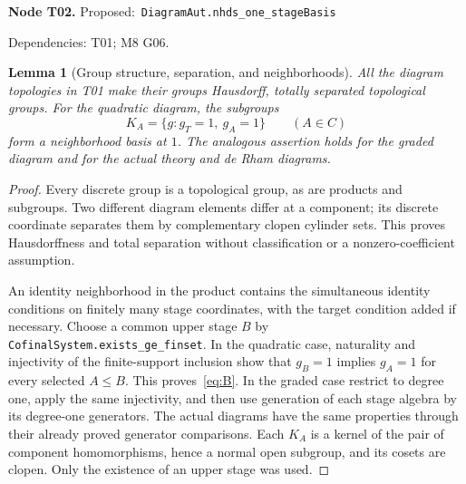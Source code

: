 \documentclass[11pt]{article}
\newtheorem{lemma}[theorem]{Lemma}
\theoremstyle{remark}\newtheorem{remark}[theorem]{Remark}
\newcommand{\code}[1]{{\normalfont\nolinkurl{#1}}}
\newcommand{\node}[3]{\par\Needspace{8\baselineskip}\smallskip\noindent\textbf{Node #1.}\quad
 \textsf{Proposed:}\ \code{#2}\par\noindent
 \textsf{Dependencies:} #3.\par\smallskip}
\begin{document}
\node{T02}{DiagramAut.nhds_one_stageBasis}{T01; M8 G06}
\begin{lemma}[Group structure, separation, and neighborhoods]\label{lem:t02}
All the diagram topologies in T01 make their groups Hausdorff, totally
separated topological groups. For the quadratic diagram, the subgroups
\[
 K_A=\{g:g_T=1,\ g_A=1\}\qquad(A\in C)
                                                               \tag{B}\label{eq:B}
\]
form a neighborhood basis at $1$. The analogous assertion holds for the
graded diagram and for the actual theory and de Rham diagrams.
\end{lemma}
\begin{proof}
Every discrete group is a topological group, as are products and
subgroups. Two different diagram elements differ at a component; its
discrete coordinate separates them by complementary clopen cylinder
sets. This proves Hausdorffness and total separation without
classification or a nonzero-coefficient assumption.

An identity neighborhood in the product contains the simultaneous
identity conditions on finitely many stage coordinates, with the target
condition added if necessary. Choose a common upper stage $B$ by
\code{CofinalSystem.exists_ge_finset}. In the quadratic case, naturality
and injectivity of the finite-support inclusion show that $g_B=1$
implies $g_A=1$ for every selected $A\leq B$. This proves~\eqref{eq:B}.
In the graded case restrict to degree one, apply the same injectivity,
and then use generation of each stage algebra by its degree-one
generators. The actual diagrams have the same properties through their
already proved generator comparisons. Each $K_A$ is a kernel of the
pair of component homomorphisms, hence a normal open subgroup, and its
cosets are clopen. Only the existence of an upper stage was used.
\end{proof}
\end{document}
